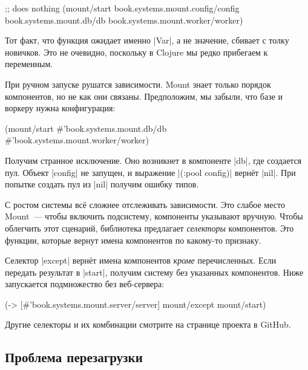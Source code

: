 \begin{english}
  \begin{clojure}
;; does nothing
(mount/start
  book.systems.mount.config/config
  book.systems.mount.db/db
  book.systems.mount.worker/worker)
  \end{clojure}
\end{english}

Тот факт, что функция ожидает именно \spverb|Var|, а не значение, сбивает с
толку новичков. Это не очевидно, поскольку в Clojure мы редко прибегаем к
переменным.

При ручном запуске рушатся зависимости. Mount знает только порядок компонентов,
но не как они связаны. Предположим, мы забыли, что базе и воркеру нужна
конфигурация:

\begin{english}
  \begin{clojure}
(mount/start
  #'book.systems.mount.db/db
  #'book.systems.mount.worker/worker)
  \end{clojure}
\end{english}

Получим странное исключение. Оно возникнет в компоненте \spverb|db|, где
создается пул. Объект \spverb|config| не запущен, и выражение
\spverb|(:pool config)| верн\"{е}т \spverb|nil|. При попытке создать
пул из \spverb|nil| получим ошибку типов.

С ростом системы вс\"{е} сложнее отслеживать зависимости. Это слабое место
Mount~--- чтобы включить подсистему, компоненты указывают вручную. Чтобы
облегчить этот сценарий, библиотека предлагает \emph{селекторы} компонентов. Это
функции, которые вернут имена компонентов по какому-то признаку.

Селектор \spverb|except| верн\"{е}т имена компонентов \emph{кроме}
перечисленных. Если передать результат в \spverb|start|, получим систему без
указанных компонентов. Ниже запускается подмножество без веб-сервера:

\begin{english}
  \begin{clojure}
(-> [#'book.systems.mount.server/server]
    mount/except
    mount/start)
  \end{clojure}
\end{english}

Другие селекторы и их комбинации смотрите на странице проекта в GitHub.

\subsection{Проблема перезагрузки}

